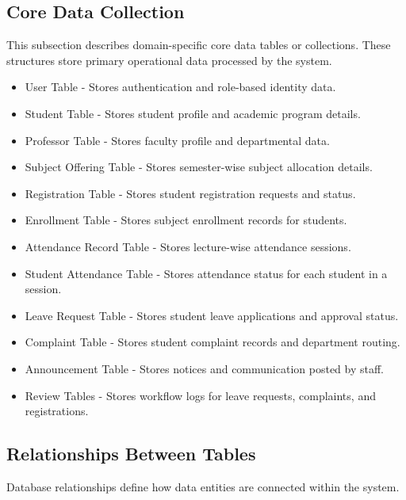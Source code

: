 \subsection{Core Data Collection}

This subsection describes domain-specific core data tables or collections. These structures store primary operational data processed by the system.
\begin{itemize}
    \item User Table - Stores authentication and role-based identity data.
    \item Student Table - Stores student profile and academic program details.
    \item Professor Table - Stores faculty profile and departmental data.
    \item Subject Offering Table - Stores semester-wise subject allocation details.
    \item Registration Table - Stores student registration requests and status.
    \item Enrollment Table - Stores subject enrollment records for students.
    \item Attendance Record Table - Stores lecture-wise attendance sessions.
    \item Student Attendance Table - Stores attendance status for each student in a session.
    \item Leave Request Table - Stores student leave applications and approval status.
    \item Complaint Table - Stores student complaint records and department routing.
    \item Announcement Table - Stores notices and communication posted by staff.
    \item Review Tables - Stores workflow logs for leave requests, complaints, and registrations.
\end{itemize}

\subsection{Relationships Between Tables}

Database relationships define how data entities are connected within the system.

